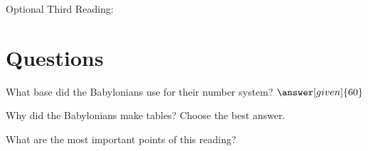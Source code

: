 \documentclass{ximera}
\begin{document}
Optional Third Reading: 


\section{Questions}

\begin{question}
What base did the Babylonians use for their number system? $\answer[given]{60}$
\end{question}

\begin{question}
Why did the Babylonians make tables?  Choose the best answer.
\begin{multipleChoice}
\end{multipleChoice}
\end{question}



\begin{question}
What are the most important points of this reading?
\begin{freeResponse}
\end{freeResponse}
\end{question}
\end{document}
